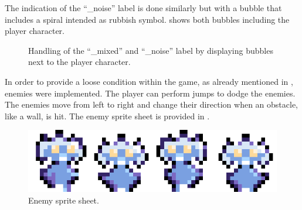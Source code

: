 The indication of the \enquote{\_noise} label is done similarly but with a bubble that includes a spiral intended as rubbish symbol.
 shows both bubbles including the player character.
\begin{figure}[!ht]
  \centering
  \hspace{2 cm}
  \caption{Handling of the \enquote{\_mixed} and \enquote{\_noise} label by displaying bubbles next to the player character.}
  \label{fig:game_design_mechanic_bubble}
\end{figure}
\FloatBarrier
\noindent
In order to provide a loose condition within the game, as already mentioned in , enemies were implemented.
The player can perform jumps to dodge the enemies.
The enemies move from left to right and change their direction when an obstacle, like a wall, is hit.
The enemy sprite sheet is provided in .
\begin{figure}[!ht]
  \centering
  \includegraphics[height=0.07\textwidth]{./6_game/figs/game_design_mechanic_enemy.png}
  \caption{Enemy sprite sheet.}
  \label{fig:game_design_mechanic_enemy}
\end{figure}
\FloatBarrier
\noindent



